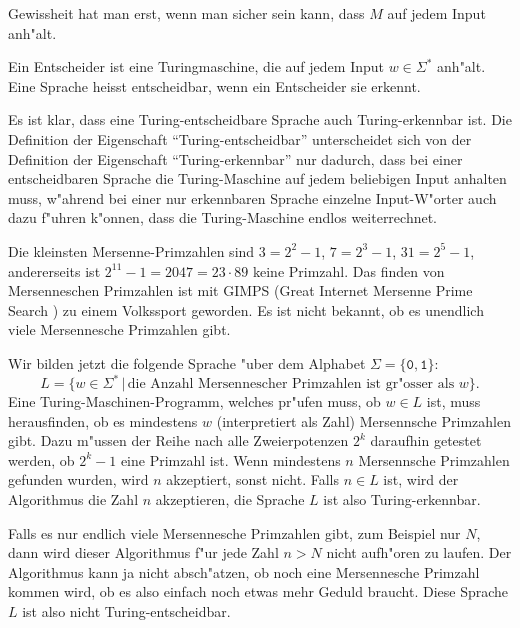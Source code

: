 Gewissheit hat man erst, wenn man sicher sein kann, dass $M$ auf
jedem Input anh"alt.

\begin{definition}
Ein Entscheider ist eine Turingmaschine, die auf jedem Input $w\in\Sigma^*$
anh"alt. Eine Sprache heisst entscheidbar, wenn ein Entscheider sie
erkennt.
\end{definition}
Es ist klar, dass eine Turing-entscheidbare Sprache auch Turing-erkennbar
ist.
Die Definition der Eigenschaft ``Turing-entscheidbar'' unterscheidet sich
von der Definition der Eigenschaft ``Turing-erkennbar'' nur dadurch,
dass bei einer entscheidbaren Sprache die Turing-Maschine auf jedem
beliebigen Input anhalten muss, w"ahrend bei einer nur erkennbaren
Sprache einzelne Input-W"orter auch dazu f"uhren k"onnen, dass die
Turing-Maschine endlos weiterrechnet.

\begin{beispiel}
Die kleinsten Mersenne-Primzahlen sind $3=2^2-1$, $7=2^3-1$, $31=2^5-1$,
andererseits ist $2^{11}-1=2047=23\cdot 89$ keine Primzahl.
Das finden von Mersenneschen Primzahlen ist mit GIMPS (Great Internet
Mersenne Prime Search \cite{skript:gimps}) zu einem Volkssport geworden.
Es ist nicht bekannt, ob es unendlich viele Mersennesche Primzahlen gibt.

Wir bilden jetzt die folgende Sprache "uber dem Alphabet
$\Sigma=\{\texttt{0},\texttt{1}\}$:
\[
L=\{w\in\Sigma^*\,|\,\text{die Anzahl Mersennescher Primzahlen ist gr"osser als $w$}\}.
\]
Eine Turing-Maschinen-Programm, welches pr"ufen muss, ob $w\in L$ ist,
muss herausfinden, ob es mindestens $w$ (interpretiert als Zahl)
Mersennsche Primzahlen gibt.
Dazu m"ussen der Reihe nach alle Zweierpotenzen $2^k$ daraufhin getestet werden,
ob $2^k-1$ eine Primzahl ist.
Wenn mindestens $n$ Mersennsche Primzahlen gefunden wurden, wird $n$
akzeptiert, sonst nicht. Falls $n\in L$ ist, wird der Algorithmus
die Zahl $n$ akzeptieren, die Sprache $L$ ist also Turing-erkennbar.

Falls es nur endlich viele Mersennesche Primzahlen gibt, zum Beispiel
nur $N$, dann wird dieser Algorithmus f"ur jede Zahl $n>N$ nicht
aufh"oren zu laufen.
Der Algorithmus kann ja nicht absch"atzen, ob noch eine Mersennesche
Primzahl kommen wird, ob es also einfach noch etwas mehr Geduld
braucht.
Diese Sprache $L$ ist also nicht Turing-entscheidbar.
\end{beispiel}

